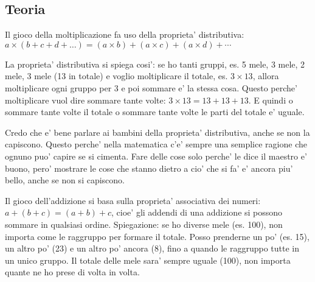 \documentclass[a4paper]{article}
\begin{document}
\subsection{Teoria}
Il gioco della moltiplicazione fa uso della proprieta' distributiva: $a \times (b+c+d+\ldots) = (a\times b)+(a\times c)+(a\times d)+\cdots$

\begin{exemp}
\end{exemp}

La proprieta' distributiva si spiega cosi': se ho tanti gruppi, es. 5 mele,  3 mele, 2 mele, 3 mele (13 in totale) e voglio moltiplicare il totale, es. $3 \times 13$, allora moltiplicare ogni gruppo per 3 e poi sommare e' la stessa cosa. Questo perche' moltiplicare vuol dire sommare tante volte: $3\times 13 = 13+13+13$. E quindi o sommare tante volte il totale o sommare tante volte le parti del totale e' uguale.

\begin{rem}
	Credo che e' bene parlare ai bambini della proprieta' distributiva, anche se non la capiscono. Questo perche' nella matematica c'e' sempre una semplice ragione che ognuno puo' capire se si cimenta. Fare delle cose solo perche' le dice il maestro e' buono, pero' mostrare le cose che stanno dietro a cio' che si fa' e' ancora piu' bello, anche se non si capiscono. 
\end{rem}

Il gioco dell'addizione si basa sulla proprieta' associativa dei numeri: $a+(b+c)=(a+b)+c$, cioe' gli addendi di una addizione si possono sommare in qualsiasi ordine. Spiegazione: se ho diverse mele (es. 100), non importa come le raggruppo per formare il totale. Posso prenderne un po' (es. 15), un altro po' (23) e un altro po' ancora (8), fino a quando le raggruppo tutte in un unico gruppo. Il totale delle mele sara' sempre uguale (100), non importa quante ne ho prese di volta in volta.

\printindex
\end{document}

